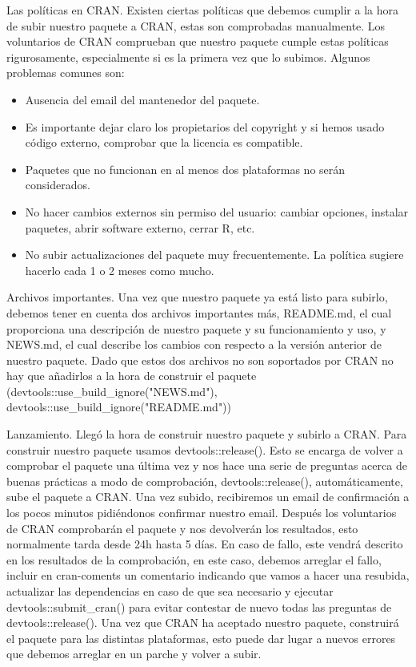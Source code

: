 Las pol\'iticas en CRAN.
Existen ciertas pol\'iticas que debemos cumplir a la hora de subir nuestro paquete a CRAN,
estas son comprobadas manualmente. Los voluntarios de CRAN comprueban que nuestro
paquete cumple estas pol\'iticas rigurosamente, especialmente si es la primera vez que lo
subimos.
Algunos problemas comunes son:
\begin{itemize}
    \item Ausencia del email del mantenedor del paquete. 
    \item Es importante dejar claro los propietarios del copyright y si hemos usado c\'odigo
externo, comprobar que la licencia es compatible.
    \item Paquetes que no funcionan en al menos dos plataformas no ser\'an considerados.
    \item No hacer cambios externos sin permiso del usuario: cambiar opciones, instalar
paquetes, abrir software externo, cerrar R, etc.
    \item No subir actualizaciones del paquete muy frecuentemente. La pol\'itica sugiere hacerlo
cada 1 o 2 meses como mucho.
\end{itemize}

Archivos importantes.
Una vez que nuestro paquete ya est\'a listo para subirlo, debemos tener en cuenta dos archivos
importantes m\'as, README.md, el cual proporciona una descripci\'on de nuestro paquete y su
funcionamiento y uso, y NEWS.md, el cual describe los cambios con respecto a la versi\'on
anterior de nuestro paquete. Dado que estos dos archivos no son soportados por CRAN no
hay que a\~nadirlos a la hora de construir el paquete (devtools::use\_build\_ignore("NEWS.md"),
devtools::use\_build\_ignore("README.md"))

Lanzamiento.
Lleg\'o la hora de construir nuestro paquete y subirlo a CRAN. Para construir nuestro paquete
usamos devtools::release(). Esto se encarga de volver a comprobar el paquete una \'ultima
vez y nos hace una serie de preguntas acerca de buenas pr\'acticas a modo de comprobaci\'on,
devtools::release(), autom\'aticamente, sube el paquete a CRAN.
Una vez subido, recibiremos un email de confirmaci\'on a los pocos minutos pidi\'endonos
confirmar nuestro email. Despu\'es los voluntarios de CRAN comprobar\'an el paquete y nos
devolver\'an los resultados, esto normalmente tarda desde 24h hasta 5 d\'ias.
En caso de fallo, este vendr\'a descrito en los resultados de la comprobaci\'on, en este caso,
debemos arreglar el fallo, incluir en cran-coments un comentario indicando que vamos a
hacer una resubida, actualizar las dependencias en caso de que sea necesario y ejecutar
devtools::submit\_cran() para evitar contestar de nuevo todas las preguntas de
devtools::release().
Una vez que CRAN ha aceptado nuestro paquete, construir\'a el paquete para las distintas
plataformas, esto puede dar lugar a nuevos errores que debemos arreglar en un parche y
volver a subir.